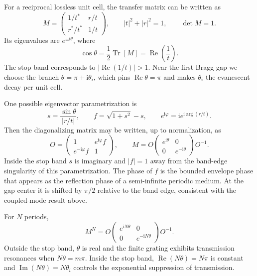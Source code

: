 \documentclass[aps,pra,twocolumn,superscriptaddress,nofootinbib]{revtex4-2}
\newcommand{\ii}{\mathrm{i}}
\renewcommand{\Re}{\operatorname{Re}}
\renewcommand{\Im}{\operatorname{Im}}
\begin{document}
For a reciprocal lossless unit cell, the transfer matrix can be written as~\cite{Markos2008, 1dfbgnote}
\begin{equation}
\label{eq:tmdef}
M = \begin{pmatrix} 1/t^* & r/t \\ r^*/t^* & 1/t \end{pmatrix},
\qquad |t|^2+|r|^2=1,
\qquad \det M=1.
\end{equation}
Its eigenvalues are $e^{\pm\ii\theta}$, where
\begin{equation}
    \cos\theta=\frac{1}{2}\operatorname{Tr}[M]=\Re\left(\frac{1}{t}\right).
\end{equation}
The stop band corresponds to $|\Re(1/t)|>1$.  Near the first Bragg gap we choose the branch $\theta=\pi+\ii\theta_i$, which pins $\Re\theta=\pi$ and makes $\theta_i$ the evanescent decay per unit cell.

One possible eigenvector parametrization is
\begin{equation}
    s=\frac{\sin\theta}{|r/t|},\qquad
    f=\sqrt{1+s^2}-s,
    \qquad e^{\ii\varphi}=\ii e^{\ii\arg(r/t)}.
\end{equation}
Then the diagonalizing matrix may be written, up to normalization, as
\begin{equation}
    \label{eq:tmat_def} O=\begin{pmatrix}1&e^{\ii\varphi}f\\ e^{-\ii\varphi}f&1\end{pmatrix},
    \qquad M=O\begin{pmatrix}e^{\ii\theta}&0\\0&e^{-\ii\theta}\end{pmatrix}O^{-1}.
\end{equation}
Inside the stop band $s$ is imaginary and $|f|=1$ away from the band-edge singularity of this parametrization.  The phase of $f$ is the bounded envelope phase that appears as the reflection phase of a semi-infinite periodic medium.  At the gap center it is shifted by $\pi/2$ relative to the band edge, consistent with the coupled-mode result above.

For $N$ periods,
\begin{equation}
    M^N=O\begin{pmatrix}e^{\ii N\theta}&0\\0&e^{-\ii N\theta}\end{pmatrix}O^{-1}.
\end{equation}
Outside the stop band, $\theta$ is real and the finite grating exhibits transmission resonances when $N\theta=m\pi$.  Inside the stop band, $\Re(N\theta)=N\pi$ is constant and $\Im(N\theta)=N\theta_i$ controls the exponential suppression of transmission.
\end{document}
